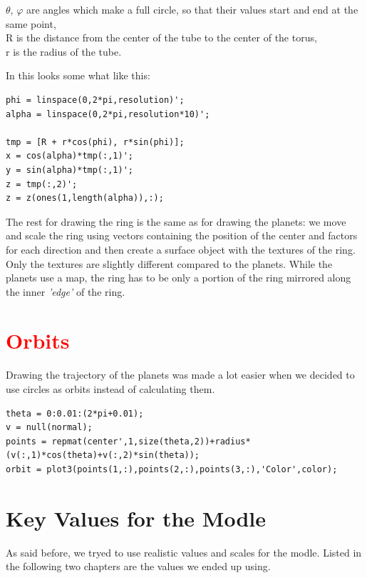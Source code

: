 $\theta$, $\varphi$ are angles which make a full circle, so that their values start and end at the same point,\\
R is the distance from the center of the tube to the center of the torus,\\
r is the radius of the tube.

In \matlab{} this looks some what like this:
\begin{framed}\begin{verbatim}
phi = linspace(0,2*pi,resolution)';
alpha = linspace(0,2*pi,resolution*10)';

tmp = [R + r*cos(phi), r*sin(phi)];
x = cos(alpha)*tmp(:,1)';
y = sin(alpha)*tmp(:,1)';
z = tmp(:,2)';
z = z(ones(1,length(alpha)),:);
\end{verbatim}\end{framed}
The rest for drawing the ring is the same as for drawing the planets: we move and scale the ring using vectors containing the position of the center and factors for each direction and then create a surface object with the textures of the ring. Only the textures are slightly different compared to the planets. While the planets use a map, the ring has to be only a portion of the ring mirrored along the inner {\em 'edge'} of the ring.


\section{\textcolor{red}{Orbits}}
Drawing the trajectory of the planets was made a lot easier when we decided to use circles as orbits instead of calculating them.

\begin{framed}\begin{verbatim}
theta = 0:0.01:(2*pi+0.01);
v = null(normal);
points = repmat(center',1,size(theta,2))+radius*(v(:,1)*cos(theta)+v(:,2)*sin(theta));
orbit = plot3(points(1,:),points(2,:),points(3,:),'Color',color);
\end{verbatim}\end{framed}

\pagebreak
\section{Key Values for the Modle}
As said before, we tryed to use realistic values and scales for the modle. Listed in the following two chapters are the values we ended up using.

